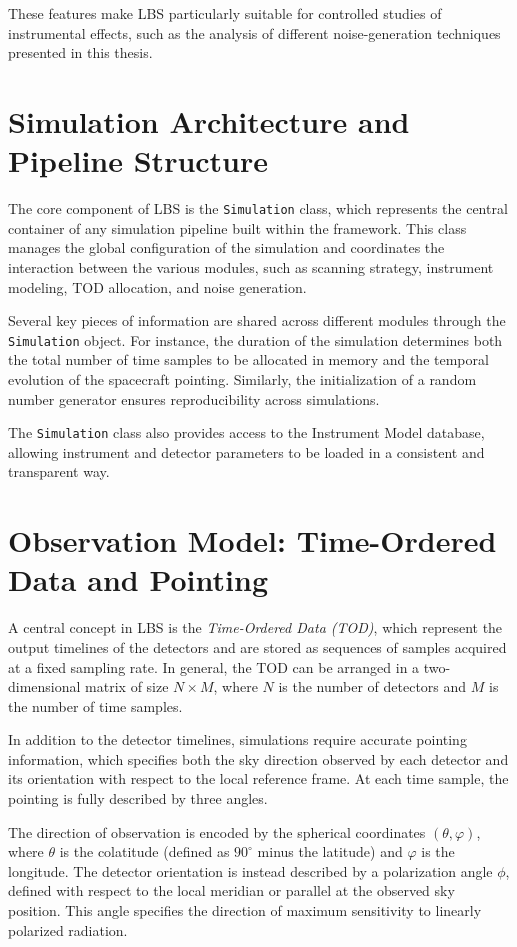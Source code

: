 These features make LBS particularly suitable for controlled studies of instrumental effects, such as the analysis of different noise-generation techniques presented in this thesis.


\section{Simulation Architecture and Pipeline Structure}
The core component of LBS is the \texttt{Simulation} class, which represents the central container of any simulation pipeline built within the framework. This class manages the global configuration of the simulation and coordinates the interaction between the various modules, such as scanning strategy, instrument modeling, TOD allocation, and noise generation.

Several key pieces of information are shared across different modules through the \texttt{Simulation} object. For instance, the duration of the simulation determines both the total number of time samples to be allocated in memory and the temporal evolution of the spacecraft pointing. Similarly, the initialization of a random number generator ensures reproducibility across simulations.

The \texttt{Simulation} class also provides access to the Instrument Model database, allowing instrument and detector parameters to be loaded in a consistent and transparent way.



\section{Observation Model: Time-Ordered Data and Pointing}

A central concept in LBS is the \textit{Time-Ordered Data (TOD)}, which represent the output timelines of the detectors and are stored as sequences of samples acquired at a fixed sampling rate. In general, the TOD can be arranged in a two-dimensional matrix of size $N \times M$, where $N$ is the number of detectors and $M$ is the number of time samples.

In addition to the detector timelines, simulations require accurate pointing information, which specifies both the sky direction observed by each detector and its orientation with respect to the local reference frame. At each time sample, the pointing is fully described by three angles.

The direction of observation is encoded by the spherical coordinates $(\theta, \varphi)$, where $\theta$ is the colatitude (defined as $90^\circ$ minus the latitude) and $\varphi$ is the longitude. The detector orientation is instead described by a polarization angle $\phi$, defined with respect to the local meridian or parallel at the observed sky position. This angle specifies the direction of maximum sensitivity to linearly polarized radiation.

